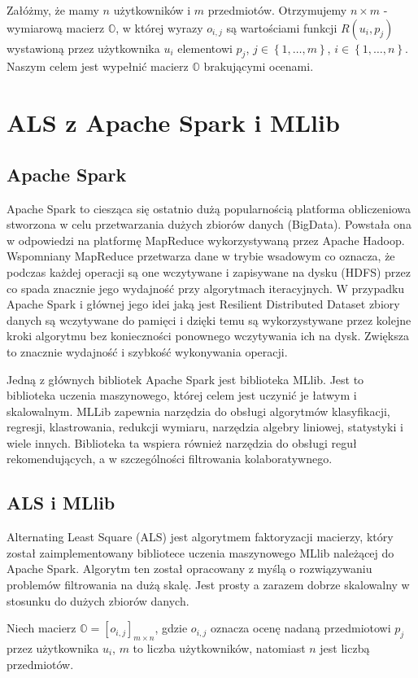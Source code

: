 \documentclass[12pt,a4paper]{report}
\newcommand{\set}[1]{\left\lbrace {#1} \right\rbrace}
\begin{document}
Załóżmy, że mamy $n$ użytkowników i $m$ przedmiotów. Otrzymujemy $n \times m$ - wymiarową macierz $\mathbb{O}$, w której wyrazy $o_{i,j}$ są wartościami funkcji $R(u_i,p_j)$ wystawioną przez użytkownika $u_i$ elementowi $p_j$, $j \in \set{1, \ldots, m}$, $i \in \set{1, \ldots, n}$. Naszym celem jest wypełnić macierz $\mathbb{O}$ brakującymi ocenami. 


\section{ALS z Apache Spark i MLlib}
\subsection{Apache Spark}
Apache Spark to ciesząca się ostatnio dużą popularnością platforma obliczeniowa stworzona w celu przetwarzania dużych zbiorów danych (BigData). Powstała ona w odpowiedzi na platformę MapReduce wykorzystywaną przez Apache Hadoop. Wspomniany MapReduce przetwarza dane w trybie wsadowym co oznacza, że podczas każdej operacji są one wczytywane i zapisywane na dysku (HDFS) przez co spada znacznie jego wydajność przy algorytmach iteracyjnych. W przypadku Apache Spark i głównej jego idei jaką jest 
Resilient Distributed Dataset zbiory danych są wczytywane do pamięci i dzięki temu są wykorzystywane przez kolejne kroki algorytmu bez konieczności ponownego wczytywania ich na dysk. Zwiększa to znacznie wydajność i szybkość wykonywania operacji.

Jedną z głównych bibliotek Apache Spark jest biblioteka MLlib. Jest to biblioteka uczenia maszynowego, której celem jest uczynić je łatwym i skalowalnym. MLLib zapewnia narzędzia do obsługi algorytmów klasyfikacji, regresji, klastrowania, redukcji wymiaru, narzędzia algebry liniowej, statystyki i wiele innych. Biblioteka ta wspiera również narzędzia do obsługi reguł rekomendujących, a w szczególności filtrowania kolaboratywnego.

\subsection{ALS i MLlib}
Alternating Least Square (ALS) jest algorytmem faktoryzacji macierzy, który został zaimplementowany bibliotece uczenia maszynowego MLlib należącej do Apache Spark. Algorytm ten został opracowany z myślą o rozwiązywaniu problemów filtrowania na dużą skalę. Jest prosty a zarazem dobrze skalowalny w stosunku do dużych zbiorów danych.

Niech macierz $\mathbb{O}=[o_{i,j}]_{m \times n}$, gdzie $o_{i,j}$ oznacza ocenę nadaną przedmiotowi $p_j$ przez użytkownika $u_i$, $m$ to liczba użytkowników, natomiast $n$ jest liczbą przedmiotów.
\end{document}
